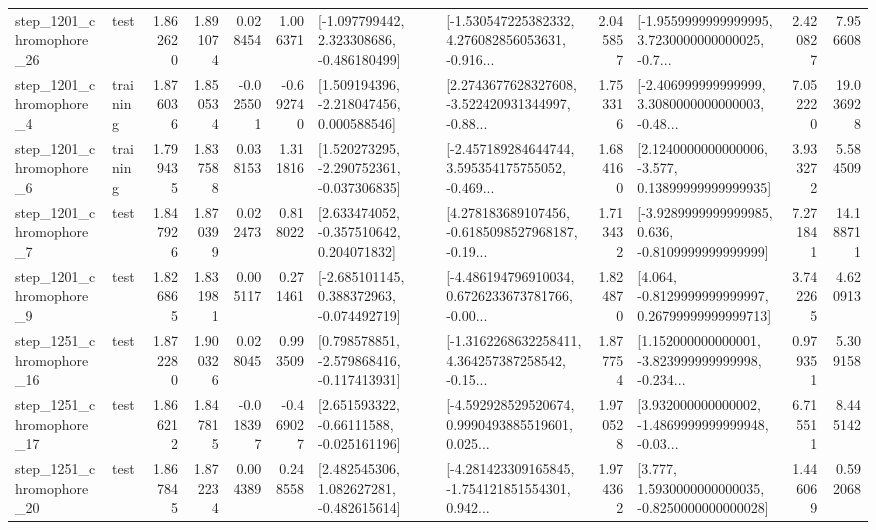 \begin{tabular}{llrrrrllrlrr}
 step\_1201\_chromophore\_26 &      test &      1.862620 &    1.891074 &      0.028454 &  1.006371 &   [-1.097799442, 2.323308686, -0.486180499] &  [-1.530547225382332, 4.276082856053631, -0.916... &       2.045857 &  [-1.9559999999999995, 3.7230000000000025, -0.7... &            2.420827 &          7.956608 \\
  step\_1201\_chromophore\_4 &  training &      1.876036 &    1.850534 &     -0.025501 & -0.692740 &    [1.509194396, -2.218047456, 0.000588546] &  [2.2743677628327608, -3.522420931344997, -0.88... &       1.753316 &  [-2.406999999999999, 3.3080000000000003, -0.48... &            7.052220 &         19.036928 \\
  step\_1201\_chromophore\_6 &  training &      1.799435 &    1.837588 &      0.038153 &  1.311816 &   [1.520273295, -2.290752361, -0.037306835] &  [-2.457189284644744, 3.595354175755052, -0.469... &       1.684160 &  [2.1240000000000006, -3.577, 0.13899999999999935] &            3.933272 &          5.584509 \\
  step\_1201\_chromophore\_7 &      test &      1.847926 &    1.870399 &      0.022473 &  0.818022 &    [2.633474052, -0.357510642, 0.204071832] &  [4.278183689107456, -0.6185098527968187, -0.19... &       1.713432 &  [-3.9289999999999985, 0.636, -0.8109999999999999] &            7.271841 &         14.188711 \\
  step\_1201\_chromophore\_9 &      test &      1.826865 &    1.831981 &      0.005117 &  0.271461 &   [-2.685101145, 0.388372963, -0.074492719] &  [-4.486194796910034, 0.6726233673781766, -0.00... &       1.824870 &  [4.064, -0.8129999999999997, 0.26799999999999713] &            3.742265 &          4.620913 \\
 step\_1251\_chromophore\_16 &      test &      1.872280 &    1.900326 &      0.028045 &  0.993509 &   [0.798578851, -2.579868416, -0.117413931] &  [-1.3162268632258411, 4.364257387258542, -0.15... &       1.877754 &  [1.152000000000001, -3.823999999999998, -0.234... &            0.979351 &          5.309158 \\
 step\_1251\_chromophore\_17 &      test &      1.866212 &    1.847815 &     -0.018397 & -0.469027 &    [2.651593322, -0.66111588, -0.025161196] &  [-4.592928529520674, 0.9990493885519601, 0.025... &       1.970528 &  [3.932000000000002, -1.4869999999999948, -0.03... &            6.715511 &          8.445142 \\
 step\_1251\_chromophore\_20 &      test &      1.867845 &    1.872234 &      0.004389 &  0.248558 &    [2.482545306, 1.082627281, -0.482615614] &  [-4.281423309165845, -1.754121851554301, 0.942... &       1.974362 &   [3.777, 1.5930000000000035, -0.8250000000000028] &            1.446069 &          0.592068 \\

\end{tabular}
